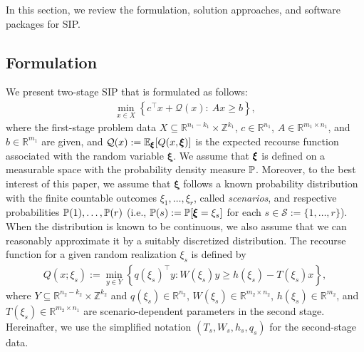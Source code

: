 In this section, we review the formulation, solution approaches, and software packages for SIP.
\subsection{Formulation}
We present two-stage SIP that is formulated as follows:
\begin{align}
\min_{x\in X}{\left\{c^\top x + \mathcal{Q}(x):\ Ax\ge b\right\}}, \label{eq:rp}
\end{align}
where the first-stage problem data $X\subseteq \mathbb{R}^{n_1-k_1}\times\mathbb{Z}^{k_1}$, $c\in\mathbb{R}^{n_1}$, $A\in\mathbb{R}^{m_1\times n_1}$, and $b\in\mathbb{R}^{m_1}$ are given, and $\mathcal{Q}(x):=\operatorname*{\mathbb{E}}_{\pmb{\xi}}[Q(x,\pmb{\xi})]$ is the expected recourse function associated with the random variable $\pmb{\xi}$.  We assume that $\pmb{\xi}$ is defined on a measurable space with the probability density measure $\operatorname*{\mathbb{P}}$. Moreover, to the best interest of this paper, we assume that $\pmb{\xi}$ follows a known probability distribution with the finite countable outcomes $\xi_1,\ldots,\xi_r$, called \textit{scenarios}, and respective probabilities $\operatorname*{\mathbb{P}}(1),\ldots,\operatorname*{\mathbb{P}}(r)$ (i.e., $\operatorname*{\mathbb{P}}(s):=\operatorname*{\mathbb{P}}[\pmb{\xi}=\xi_s]$ for each $s\in\mathcal{S}:=\{1,\ldots,r\}$). When the distribution is known to be continuous, we also assume that we can reasonably approximate it by a suitably discretized distribution. 
The recourse function for a given random realization $\xi_s$ is defined by 
\begin{align}
Q(x;\xi_s):=\min_{y\in Y}\left\{q(\xi_s)^\top y : W(\xi_s)y\ge h(\xi_s)-T(\xi_s)x\right\}, \label{eq:rf}
\end{align}
where $Y\subseteq\mathbb{R}^{n_2-k_2}\times\mathbb{Z}^{k_2}$ and $q(\xi_s)\in\mathbb{R}^{n_2}$, $W(\xi_s)\in\mathbb{R}^{m_2\times n_2}$, $h(\xi_s)\in\mathbb{R}^{m_2}$, and $T(\xi_s)\in\mathbb{R}^{m_2\times n_1}$ are scenario-dependent parameters in the second stage. Hereinafter, we use the simplified notation $(T_s,W_s,h_s,q_s)$ for the second-stage data. 

